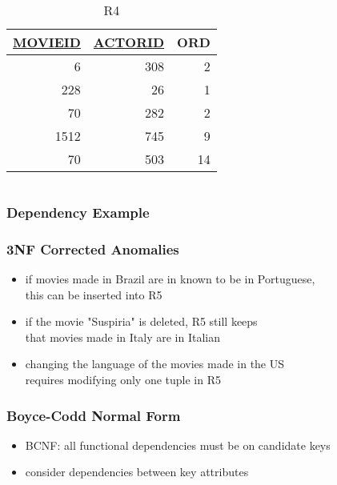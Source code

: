 \documentclass[dvipsnames]{beamer}
\begin{document}
\begin{frame}
\begin{columns}[t]
    \begin{footnotesize}
    \begin{table}
      \caption{R4}
      \begin{tabular}{|r|r|r|}\hline
\underline{MOVIEID} & \underline{ACTORID} & ORD\\[2pt]\hline\hline
   6 & 308 &  2\\\hline
 228 &  26 &  1\\\hline
  70 & 282 &  2\\\hline
1512 & 745 &  9\\\hline
  70 & 503 & 14\\\hline
      \end{tabular}
    \end{table}
    \end{footnotesize}
  \end{columns}
\end{frame}

\begin{frame}
  \frametitle{Dependency Example}

  \begin{center}
  \end{center}
 \end{frame}

\begin{frame}
  \frametitle{3NF Corrected Anomalies}

  \begin{itemize}
    \item if movies made in Brazil are in known to be in Portuguese,\\
      this can be inserted into R5

    \pause
    \medskip
    \item if the movie "Suspiria" is deleted, R5 still keeps\\
      that movies made in Italy are in Italian

    \pause
    \medskip
    \item changing the language of the movies made in the US\\
      requires modifying only one tuple in R5
  \end{itemize}
\end{frame}

\begin{frame}
  \frametitle{Boyce-Codd Normal Form}

  \begin{itemize}
    \item \alert{BCNF}: all functional dependencies must be on candidate keys
    \item consider dependencies between key attributes
  \end{itemize}
\end{frame}
\end{document}
